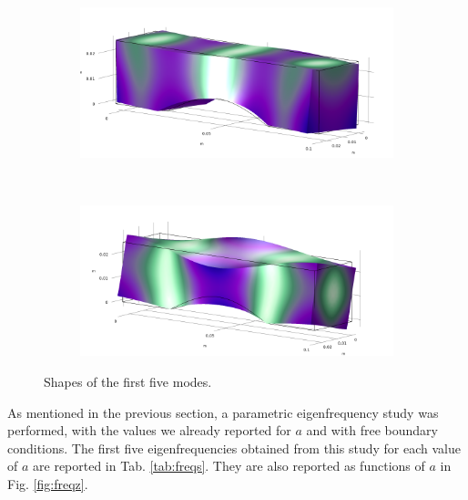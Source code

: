 \documentclass[a4paper]{article}
\begin{document}
\begin{figure}[h]
	\begin{subfigure}{0.3\linewidth}
		\centering
		\includegraphics[width=0.95\linewidth]{04a.png}
	\end{subfigure}
	~
	\begin{subfigure}{0.3\linewidth}
		\centering
		\includegraphics[width=0.95\linewidth]{05a.png}
	\end{subfigure}
	
	\caption{Shapes of the first five modes.}
	\label{fig:modeA}
\end{figure}
As mentioned in the previous section, a parametric eigenfrequency study was performed, with the values we already reported for $a$ and with free boundary conditions. The first five eigenfrequencies obtained from this study for each value of $a$ are reported in Tab. \ref{tab:freqs}. They are also reported as functions of $a$ in Fig. \ref{fig:freqz}.
\end{document}
